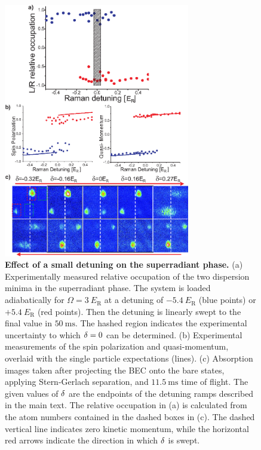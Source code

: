 \documentclass[prl,aps,twocolumn,floatfix]{revtex4}
\begin{document}
\begin{figure}[tbp]
\centering
\includegraphics[width=3.2in]{Figure-3Engels.eps}
\caption{\textbf{Effect of a small detuning on the superradiant
phase.}  (a) Experimentally measured relative occupation of the two
dispersion minima in the superradiant phase. The system is loaded
adiabatically for $\Omega =3~E_{\text{R}}$ at a detuning of $-5.4~E_{\text{R}%
}$ (blue points) or $+5.4~E_{\text{R}}$ (red points). Then the detuning is
linearly swept to the final value in $50~\text{ms}$. The hashed region
indicates the experimental uncertainty to which $\protect\delta =0$ can be
determined. (b) Experimental measurements of the spin polarization and
quasi-momentum, overlaid with the single particle expectations
(lines). (c) Absorption images taken after projecting the BEC onto the bare
states, applying Stern-Gerlach separation, and $11.5~\text{ms}$ time of
flight. The given values of $\protect\delta$ are the endpoints of the
detuning ramps described in the main text. The relative occupation in (a) is
calculated from the atom numbers contained in the dashed boxes in (c). The
dashed vertical line indicates zero kinetic momentum, while the horizontal
red arrows indicate the direction in which $\protect\delta $ is swept.}
\label{Fig3}
\end{figure}
\end{document}
